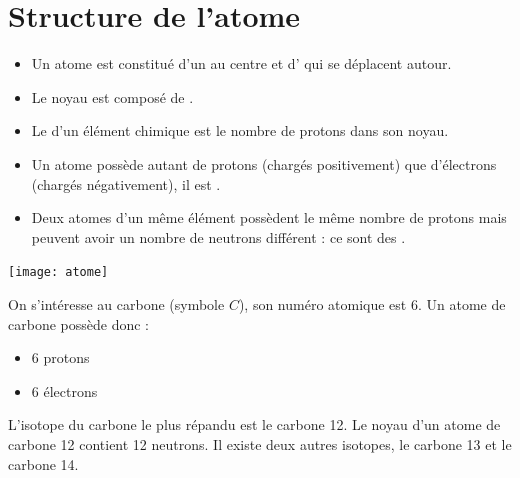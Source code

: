 \documentclass[12pt,a4paper]{article}
\date{}
\title{}
\begin{document}
	
	


%

\section{Structure de l'atome}

%	
\begin{mybilan}
	\begin{itemize}
		\item Un atome est constitué d'un  au centre et d' qui se déplacent autour.
		\item Le noyau est composé de .
		\item Le  d'un élément chimique est le nombre de protons dans son noyau.
		\item Un atome possède autant de protons (chargés positivement) que d'électrons (chargés négativement), il est .
		\item Deux atomes d'un même élément possèdent le même nombre de protons mais peuvent avoir un nombre de neutrons différent : ce sont des .
	\end{itemize}
	
	
	\begin{center}
		\texttt{[image: atome]}
	\end{center}

\end{mybilan}




\begin{myex}
	On s'intéresse au carbone (symbole $C$), son numéro atomique est 6. Un atome de carbone possède donc :
	\begin{itemize}
		\item 6 protons
		\item 6 électrons
	\end{itemize}

	L'isotope du carbone le plus répandu est le carbone 12. Le noyau d'un atome de carbone 12 contient 12 neutrons. Il existe deux autres isotopes, le carbone 13 et le carbone 14.
\end{myex}
\end{document}
